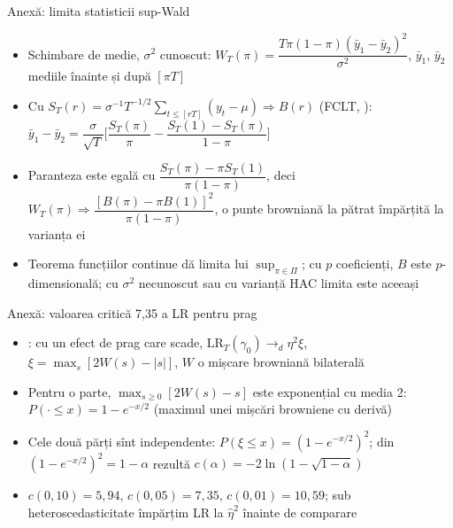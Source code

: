 \begin{frame}{Anexă: limita statisticii sup-Wald}
\hypertarget{atsapp1}{}
\itemsize{\small}
\begin{itemize}
    \item Schimbare de medie, $\sigma^2$ cunoscut: $W_T(\pi) = \dfrac{T\pi(1 - \pi)(\bar y_1 - \bar y_2)^2}{\sigma^2}$, $\bar y_1$, $\bar y_2$ mediile înainte și după $[\pi T]$
    \item Cu $S_T(r) = \sigma^{-1}T^{-1/2}\sum_{t \le [rT]}(y_t - \mu) \Rightarrow B(r)$ (FCLT, ): $\bar y_1 - \bar y_2 = \dfrac{\sigma}{\sqrt T}\Big[\dfrac{S_T(\pi)}{\pi} - \dfrac{S_T(1) - S_T(\pi)}{1 - \pi}\Big]$
    \item Paranteza este egală cu $\dfrac{S_T(\pi) - \pi S_T(1)}{\pi(1 - \pi)}$, deci $W_T(\pi) \Rightarrow \dfrac{[B(\pi) - \pi B(1)]^2}{\pi(1 - \pi)}$, o punte browniană la pătrat împărțită la varianța ei
    \item Teorema funcțiilor continue dă limita lui $\sup_{\pi \in \Pi}$; cu $p$ coeficienți, $B$ este $p$-dimensională; cu $\sigma^2$ necunoscut sau cu varianță HAC limita este aceeași
\end{itemize}
\end{frame}

\begin{frame}{Anexă: valoarea critică 7,35 a LR pentru prag}
\hypertarget{atsapp2}{}
\itemsize{\small}
\begin{itemize}
    \item {}: cu un efect de prag care scade, $\mathrm{LR}_T(\gamma_0) \to_d \eta^2\xi$, $\xi = \max_{s}[2W(s) - |s|]$, $W$ o mișcare browniană bilaterală
    \item Pentru o parte, $\max_{s \ge 0}[2W(s) - s]$ este exponențial cu media 2: $P(\cdot \le x) = 1 - e^{-x/2}$ (maximul unei mișcări browniene cu derivă)
    \item Cele două părți sînt independente: $P(\xi \le x) = (1 - e^{-x/2})^2$; din $(1 - e^{-x/2})^2 = 1 - \alpha$ rezultă $c(\alpha) = -2\ln(1 - \sqrt{1 - \alpha})$
    \item $c(0{,}10) = 5{,}94$, $c(0{,}05) = 7{,}35$, $c(0{,}01) = 10{,}59$; sub heteroscedasticitate împărțim LR la $\hat\eta^2$ înainte de comparare
\end{itemize}
\end{frame}

